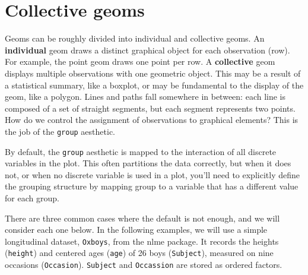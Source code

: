\hypertarget{sec:grouping}{%
\section{Collective geoms}\label{sec:grouping}}

Geoms can be roughly divided into individual and collective geoms. An
\textbf{individual} geom draws a distinct graphical object for each
observation (row). For example, the point geom draws one point per row.
A \textbf{collective} geom displays multiple observations with one
geometric object. This may be a result of a statistical summary, like a
boxplot, or may be fundamental to the display of the geom, like a
polygon. Lines and paths fall somewhere in between: each line is
composed of a set of straight segments, but each segment represents two
points. How do we control the assignment of observations to graphical
elements? This is the job of the \texttt{group} aesthetic.
  

By default, the \texttt{group} aesthetic is mapped to the interaction of
all discrete variables in the plot. This often partitions the data
correctly, but when it does not, or when no discrete variable is used in
a plot, you'll need to explicitly define the grouping structure by
mapping group to a variable that has a different value for each group.

There are three common cases where the default is not enough, and we
will consider each one below. In the following examples, we will use a
simple longitudinal dataset, \texttt{Oxboys}, from the nlme package. It
records the heights (\texttt{height}) and centered ages (\texttt{age})
of 26 boys (\texttt{Subject}), measured on nine occasions
(\texttt{Occasion}). \texttt{Subject} and \texttt{Occassion} are stored
as ordered factors.  

\begin{Shaded}
\begin{Highlighting}[]
 \NormalTok{)}
\end{Highlighting}
\end{Shaded}

